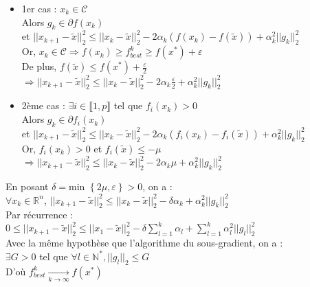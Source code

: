 \documentclass[12pt,a4paper]{article}
\begin{document}
{\begin{itemize}
    \item 1er cas : $x_k \in \mathcal{C}$\\
    Alors $g_k \in \partial f(x_k)$\\
    et $||x_{k+1} - \tilde{x}||_2^2 \leq ||x_k - \tilde{x}||_2^2 - 2 \alpha_k (f(x_k) - f(\tilde{x})) + \alpha_k^2 ||g_k||_2^2$\\

    Or, $x_k \in \mathcal{C} \Rightarrow f(x_k) \geq f^k_{best} \geq f(x^*) + \varepsilon$\\
    De plus, $f(\tilde{x}) \leq f(x^*) + \frac{\varepsilon}{2}$\\
    $\Rightarrow ||x_{k+1} - \tilde{x}||_2^2 \leq ||x_k - \tilde{x}||_2^2 - 2 \alpha_k \frac{\varepsilon}{2} + \alpha_k^2 ||g_k||_2^2$\\

    \item 2ème cas : $\exists i \in \llbracket 1, p \rrbracket$ tel que $f_i(x_k) > 0$\\
    Alors $g_k \in \partial f_i(x_k)$\\
    et $||x_{k+1} - \tilde{x}||_2^2 \leq ||x_k - \tilde{x}||_2^2 - 2 \alpha_k (f_i(x_k) - f_i(\tilde{x})) + \alpha_k^2 ||g_k||_2^2$\\

    Or, $f_i(x_k) > 0$ et $f_i(\tilde{x}) \leq - \mu$\\
    $\Rightarrow ||x_{k+1} - \tilde{x}||_2^2 \leq ||x_k - \tilde{x}||_2^2 - 2 \alpha_k \mu + \alpha_k^2 ||g_k||_2^2$\\
\end{itemize}

En posant $\delta = \text{min } \left\{ 2\mu, \varepsilon \right\} > 0$, on a :\\
$\forall x_k \in \mathbb{R}^n$, $||x_{k+1} - \tilde{x}||_2^2 \leq ||x_k - \tilde{x}||_2^2 - \delta \alpha_k + \alpha_k^2 ||g_k||_2^2$\\

Par récurrence :\\
$0 \leq ||x_{k+1} - \tilde{x}||_2^2 \leq ||x_1 - \tilde{x}||_2^2 - \delta \sum_{l=1}^k \alpha_l + \sum_{l=1}^k \alpha_l^2 ||g_l||_2^2$\\

Avec la même hypothèse que l'algorithme du sous-gradient, on a :\\
$\exists G > 0$ tel que $\forall l \in \mathbb{N}^*, ||g_l||_2 \leq G$\\

D'où $f_{best}^k \xrightarrow[k \rightarrow \infty]{} f(x^*)$\\
}
\end{document}
